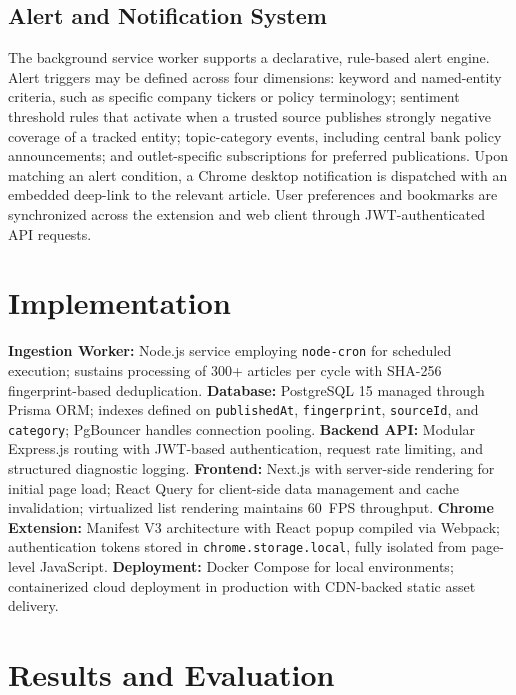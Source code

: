 \documentclass[conference]{IEEEtran}
\begin{document}
\subsection{Alert and Notification System}
The background service worker supports a declarative, rule-based alert engine. Alert triggers may be defined across four dimensions: keyword and named-entity criteria, such as specific company tickers or policy terminology; sentiment threshold rules that activate when a trusted source publishes strongly negative coverage of a tracked entity; topic-category events, including central bank policy announcements; and outlet-specific subscriptions for preferred publications. Upon matching an alert condition, a Chrome desktop notification is dispatched with an embedded deep-link to the relevant article. User preferences and bookmarks are synchronized across the extension and web client through JWT-authenticated API requests.

\section{Implementation}

\textbf{Ingestion Worker:} Node.js service employing \texttt{node-cron} for scheduled execution; sustains processing of 300+ articles per cycle with SHA-256 fingerprint-based deduplication. \textbf{Database:} PostgreSQL 15 managed through Prisma ORM; indexes defined on \texttt{publishedAt}, \texttt{fingerprint}, \texttt{sourceId}, and \texttt{category}; PgBouncer handles connection pooling. \textbf{Backend API:} Modular Express.js routing with JWT-based authentication, request rate limiting, and structured diagnostic logging. \textbf{Frontend:} Next.js with server-side rendering for initial page load; React Query for client-side data management and cache invalidation; virtualized list rendering maintains 60~FPS throughput. \textbf{Chrome Extension:} Manifest V3 architecture with React popup compiled via Webpack; authentication tokens stored in \texttt{chrome.storage.local}, fully isolated from page-level JavaScript. \textbf{Deployment:} Docker Compose for local environments; containerized cloud deployment in production with CDN-backed static asset delivery.

\section{Results and Evaluation}
\end{document}

